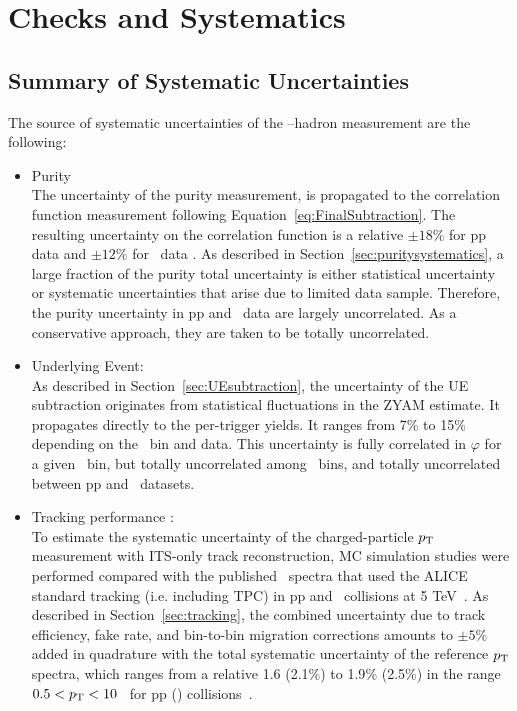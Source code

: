 \chapter{Checks and Systematics}

\section{Summary of Systematic Uncertainties}
The source of systematic uncertainties of the \gammaiso--hadron measurement are the following:
\begin{itemize}
    \item Purity\\
The uncertainty of the purity measurement, is propagated to the correlation function measurement following Equation~\ref{eq:FinalSubtraction}. The resulting uncertainty on the correlation function is a relative $\pm18\%$ for pp data and  $\pm12\%$ for \pPb~data . As described in Section~\ref{sec:puritysystematics}, a large fraction of the purity total uncertainty is either statistical uncertainty or systematic uncertainties that arise due to limited data sample. Therefore, the purity uncertainty in pp and \pPb~data are largely uncorrelated. As a conservative approach, they are taken to be totally uncorrelated.

\item	Underlying Event:\\
As described in Section~\ref{sec:UEsubtraction}, the uncertainty of the UE subtraction originates from statistical fluctuations in the ZYAM estimate. It propagates directly to the per-trigger yields. It ranges from 7\% to 15\% depending on the \zt~bin and data. This uncertainty is fully correlated in $\varphi$ for a given \zt~bin, but totally uncorrelated among \zt~bins, and totally uncorrelated between pp and \pPb~datasets.

\item Tracking performance :\\
To estimate the systematic uncertainty of the charged-particle $p_{\mathrm{T}}$ measurement with ITS-only track reconstruction, MC simulation studies were performed compared with the published \pt~spectra that used the ALICE standard tracking (i.e. including TPC) in pp and \pPb~collisions at 5 TeV~\cite{Acharya:2018qsh}. As described in Section~\ref{sec:tracking}, the combined uncertainty due to track efficiency, fake rate, and bin-to-bin migration corrections amounts to $\pm5\%$ added in quadrature with the total systematic uncertainty of the reference $p_{\mathrm{T}}$ spectra, which ranges from a relative 1.6 (2.1$\%$) to 1.9$\%$ (2.5$\%$) in the range $0.5<p_{\mathrm{T}}<10$ \GeVc~for pp (\pPb) collisions~\cite{Acharya:2018qsh}. 


\end{itemize}
